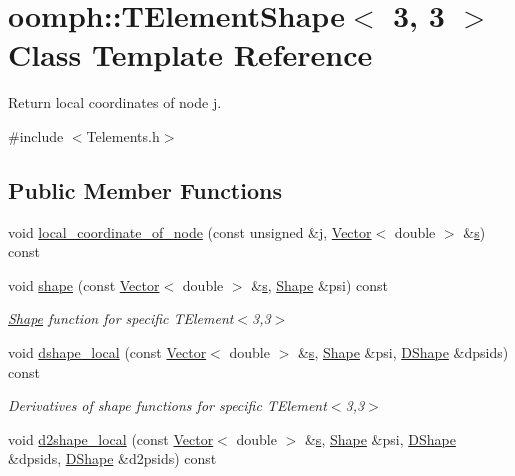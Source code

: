 \hypertarget{classoomph_1_1TElementShape_3_013_00_013_01_4}{}\section{oomph\+:\+:T\+Element\+Shape$<$ 3, 3 $>$ Class Template Reference}
\label{classoomph_1_1TElementShape_3_013_00_013_01_4}


Return local coordinates of node j.  




{\ttfamily \#include $<$Telements.\+h$>$}

\subsection*{Public Member Functions}
\begin{DoxyCompactItemize}
\item 
void \hyperlink{classoomph_1_1TElementShape_3_013_00_013_01_4_aaf503b5a7a9843fc49f71fea61ab14ce}{local\+\_\+coordinate\+\_\+of\+\_\+node} (const unsigned \&j, \hyperlink{classoomph_1_1Vector}{Vector}$<$ double $>$ \&\hyperlink{cfortran_8h_ab7123126e4885ef647dd9c6e3807a21c}{s}) const
\item 
void \hyperlink{classoomph_1_1TElementShape_3_013_00_013_01_4_a1bfc7a56eec9e2ce91f5e50e07a54a10}{shape} (const \hyperlink{classoomph_1_1Vector}{Vector}$<$ double $>$ \&\hyperlink{cfortran_8h_ab7123126e4885ef647dd9c6e3807a21c}{s}, \hyperlink{classoomph_1_1Shape}{Shape} \&psi) const
\begin{DoxyCompactList}\small\item\em \hyperlink{classoomph_1_1Shape}{Shape} function for specific T\+Element$<$3,3$>$ \end{DoxyCompactList}\item 
void \hyperlink{classoomph_1_1TElementShape_3_013_00_013_01_4_afbc876a2d227fa59e156dffbac033812}{dshape\+\_\+local} (const \hyperlink{classoomph_1_1Vector}{Vector}$<$ double $>$ \&\hyperlink{cfortran_8h_ab7123126e4885ef647dd9c6e3807a21c}{s}, \hyperlink{classoomph_1_1Shape}{Shape} \&psi, \hyperlink{classoomph_1_1DShape}{D\+Shape} \&dpsids) const
\begin{DoxyCompactList}\small\item\em Derivatives of shape functions for specific T\+Element$<$3,3$>$ \end{DoxyCompactList}\item 
void \hyperlink{classoomph_1_1TElementShape_3_013_00_013_01_4_ac40cce78503b5d721f54537fc701898e}{d2shape\+\_\+local} (const \hyperlink{classoomph_1_1Vector}{Vector}$<$ double $>$ \&\hyperlink{cfortran_8h_ab7123126e4885ef647dd9c6e3807a21c}{s}, \hyperlink{classoomph_1_1Shape}{Shape} \&psi, \hyperlink{classoomph_1_1DShape}{D\+Shape} \&dpsids, \hyperlink{classoomph_1_1DShape}{D\+Shape} \&d2psids) const
\end{DoxyCompactItemize}


